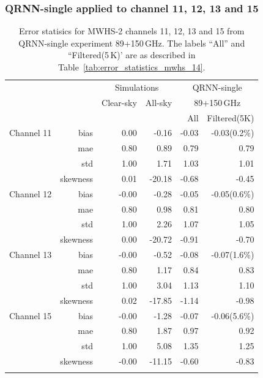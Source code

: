 \documentclass[amt]{copernicus}
\begin{document}
\subsubsection{QRNN-single applied to channel 11, 12, 13 and 15}
\label{sec:mwhs_others}
\begin{table}[t]
	\caption{ Error statisics for MWHS-2 channels 11, 12, 13 and 15 from QRNN-single experiment 89+150\,GHz. The labels ``All'' and ``Filtered(5\,K)' are as described in Table~\ref{tab:error_statistics_mwhs_14}.}
	\label{tab:error_statistics_mwhs_others}
	\begin{tabular}{lrrr|rr}
		\tophline
		&&\multicolumn{2}{c|}{Simulations}& \multicolumn{2}{c}{QRNN-single} \\
		\cline{2-6}
		& &  Clear-sky &   All-sky &  \multicolumn{2}{c}{89+150\,GHz}  \\
		&	&		   &			& All & Filtered(5K)\\
		\middlehline
		Channel 11  &   bias     & 0.00 &  -0.16 & -0.03 & -0.03(0.2\%)  \\
				    &	mae      & 0.80 &   0.89 &  0.79 &  0.79  \\
					&	std      & 1.00 &   1.71 &  1.03 &  1.01  \\
					&	skewness & 0.01 & -20.18 & -0.68 & -0.45  \\
		\middlehline
		Channel 12  & bias     & -0.00 &  -0.28 & -0.05 & -0.05(0.6\%)  \\
					& mae      &  0.80 &   0.98 &  0.81 &  0.80  \\
					& std      &  1.00 &   2.26 &  1.07 &  1.05  \\
					& skewness &  0.00 & -20.72 & -0.91 & -0.70  \\
		\middlehline
		Channel 13  & bias     & -0.00 &  -0.52 & -0.08 & -0.07(1.6\%)  \\
					& mae      &  0.80 &   1.17 &  0.84 &  0.83  \\
					& std      &  1.00 &   3.04 &  1.13 &  1.10  \\
					& skewness &  0.02 & -17.85 & -1.14 & -0.98 \\		
		\middlehline
		Channel 15  & bias     & -0.00 &  -1.28 & -0.07 & -0.06(5.6\%)  \\
					& mae      &  0.80 &   1.87 &  0.97 &  0.92 \\
					& std      &  1.00 &   5.08 &  1.35 &  1.25 \\
					& skewness & -0.00 & -11.15 & -0.60 & -0.83  \\ 
		\bottomhline
	\end{tabular}
\end{table}
\end{document}
